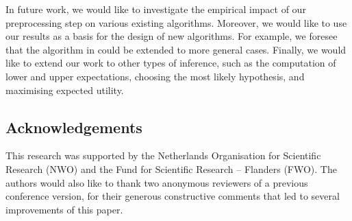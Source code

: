 \documentclass[10pt,a4paper]{paper}
\theoremstyle{definition}
\begin{document}
In future work, we would like to investigate the empirical impact of our preprocessing step on various existing algorithms. Moreover, we would like to use our results as a basis for the design of new algorithms.
For example, we foresee that the algorithm in \cite{Fagiuoli:1998ft} could be extended to more general cases. Finally, we would like to extend our work to other types of inference, such as the computation of lower and upper expectations, choosing the most likely hypothesis, and maximising expected utility.


\subsection*{Acknowledgements}

This research was supported by the Netherlands Organisation for Scientific Research (NWO) and the Fund for Scientific Research -- Flanders (FWO). The authors would also like to thank two anonymous reviewers of a previous conference version, for their generous constructive comments that led to several improvements of this paper.

 



\end{document}
